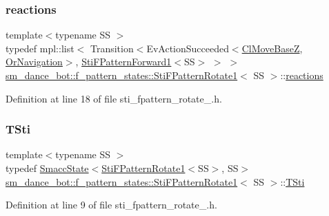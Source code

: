 \subsubsection{\texorpdfstring{reactions}{reactions}}
{\footnotesize\ttfamily template$<$typename SS $>$ \\
typedef mpl\+::list$<$ Transition$<$Ev\+Action\+Succeeded$<$\hyperlink{classmove__base__z__client_1_1ClMoveBaseZ}{Cl\+Move\+BaseZ}, \hyperlink{classsm__dance__bot_1_1OrNavigation}{Or\+Navigation}$>$, \hyperlink{structsm__dance__bot_1_1f__pattern__states_1_1StiFPatternForward1}{Sti\+F\+Pattern\+Forward1}$<$SS$>$ $>$ $>$ \hyperlink{structsm__dance__bot_1_1f__pattern__states_1_1StiFPatternRotate1}{sm\+\_\+dance\+\_\+bot\+::f\+\_\+pattern\+\_\+states\+::\+Sti\+F\+Pattern\+Rotate1}$<$ SS $>$\+::\hyperlink{structsm__dance__bot_1_1f__pattern__states_1_1StiFPatternRotate1_a7251b025614a0119a968d40c928ffd59}{reactions}}



Definition at line 18 of file sti\+\_\+fpattern\+\_\+rotate\+\_.\+h.

\mbox{\label{structsm__dance__bot_1_1f__pattern__states_1_1StiFPatternRotate1_a3fafd58718e0f6aada113795bdf2c841}} 
\subsubsection{\texorpdfstring{T\+Sti}{TSti}}
{\footnotesize\ttfamily template$<$typename SS $>$ \\
typedef \hyperlink{classSmaccState}{Smacc\+State}$<$\hyperlink{structsm__dance__bot_1_1f__pattern__states_1_1StiFPatternRotate1}{Sti\+F\+Pattern\+Rotate1}$<$SS$>$, SS$>$ \hyperlink{structsm__dance__bot_1_1f__pattern__states_1_1StiFPatternRotate1}{sm\+\_\+dance\+\_\+bot\+::f\+\_\+pattern\+\_\+states\+::\+Sti\+F\+Pattern\+Rotate1}$<$ SS $>$\+::\hyperlink{structsm__dance__bot_1_1f__pattern__states_1_1StiFPatternRotate1_a3fafd58718e0f6aada113795bdf2c841}{T\+Sti}}



Definition at line 9 of file sti\+\_\+fpattern\+\_\+rotate\+\_.\+h.



